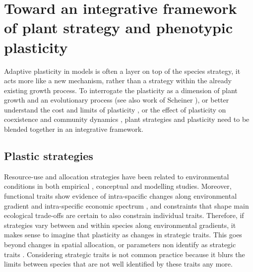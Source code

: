 \textbf{}

\section{Toward an integrative framework of plant strategy and phenotypic plasticity}

Adaptive plasticity in models is often a layer on top of the species strategy, it acts more like a new mechanism, rather than a strategy within the already existing growth process. To interrogate the plasticity as a dimension of plant growth and an evolutionary process \parencite{bradshaw_evolutionary_1965} (see also work of Scheiner \parencite{scheiner_genetics_1989, scheiner_genetics_2002 ,scheiner_genetics_2012}), or better understand the cost and limits of plasticity \cite{dewitt_costs_1998, callahan_phenotypic_2008, auld_re-evaluating_2009}, or the effect of plasticity on coexistence and community dynamics \cite{hart_how_2016}, plant strategies and plasticity need to be blended together in an integrative framework.

\subsection{Plastic strategies}

Resource-use and allocation strategies have been related to environmental conditions in both empirical \parencite{wright_leaves_2002, ackerly_functional_2004, poorter_leaf_2006}, conceptual \parencite{grime_evidence_1977, westoby_leaf-height-seed_1998} and modelling\parencite{kleidon_global_2000, scheiter_impacts_2009, reineking_environmental_2006} studies. Moreover, functional traits show evidence of intra-spacific changes along environmental gradient \parencite{kichenin_contrasting_2013} and intra-specific economic spectrum \parencite{hu_novel_2015}, and constraints that shape main ecological trade-offs are certain to also constrain individual traits. Therefore, if strategies vary between and within species along environmental gradients, it makes sense to imagine that plasticity as changes in strategic traits. This goes beyond changes in spatial allocation\parencite{schapendonk_lingra_1998}, or parameters non identify as strategic traits \cite{lohier_explaining_2014, feller_mathematical_2015}. Considering strategic traits is not common practice because it blurs the limits between species that are not well identified by these traits any more.

